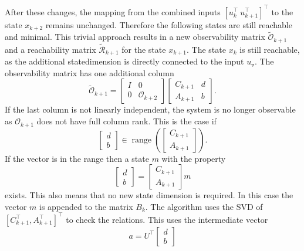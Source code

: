 \documentclass[doctype=mastersthesis,BCOR=15mm,biblatex]{ldvbook}%
\DeclareMathOperator{\range}{range}
\newcommand{\R}{\mathcal{R}} %
\newcommand{\Ob}{\mathcal{O}} %
\newcommand{\eye}{I} %
\newcommand{\m}{\triangledown} %
\begin{document}
After these changes, the mapping from the combined inputs $[u_k^\top \: u_{k+1}^\top]^\top$
to the state $x_{k+2}$ remains unchanged. Therefore the following states are still reachable and minimal.
This trivial approach results in a new observability matrix $\tilde{\Ob}_{k+1}$ and a reachability matrix $\tilde{\R}_{k+1}$ for the state $x_{k+1}$.
The state $x_k$ is still reachable, as the additional statedimension is directly connected to the input $u_\m$.
The observability matrix has one additional column
\begin{equation}\label{eq:strucure_mover}
	\tilde{\Ob}_{k+1}
	=
	\begin{bmatrix}
	\eye & 0\\ 0 &\Ob_{k+2}
	\end{bmatrix}
	\begin{bmatrix}
	C_{k+1} & d\\
	A_{k+1} & b
	\end{bmatrix}
	.
\end{equation}
If the last column is not linearly independent, the system is no longer observable as $\Ob_{k+1}$ does not have full column rank.
This is the case if
\begin{equation}
	\begin{bmatrix}
	d\\b
	\end{bmatrix}
	\in
	\range\left(
	\begin{bmatrix}
	C_{k+1}\\A_{k+1}
	\end{bmatrix}\right).
\end{equation}
If the vector is in the range then a state $m$ with the property
\begin{equation}
	\begin{bmatrix}
	d\\b
	\end{bmatrix}
	=
	\begin{bmatrix}
	C_{k+1}\\A_{k+1}
	\end{bmatrix}
	m
\end{equation}
exists.
This also means that no new state dimension is required.
In this case the vector $m$ is appended to the matrix $B_{k}$.
The algorithm uses the SVD of $[C_{k+1}^\top,A_{k+1}^\top]^\top$ to check the relations.
This uses the intermediate vector 
\begin{equation}
	a = U^\top 	
	\begin{bmatrix}
	d\\b
	\end{bmatrix}
\end{equation} 
\end{document}
